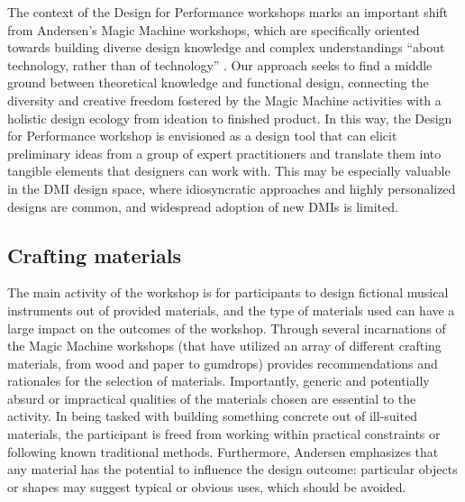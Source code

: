 \documentclass[letterpaper, 12pt]{article}
\begin{document}
The context of the Design for Performance workshops marks an important shift from Andersen's Magic Machine workshops, which are specifically oriented towards building diverse design knowledge and complex understandings ``about technology, rather than of technology'' \citep[p. 1]{Andersen2019}. Our approach seeks to find a middle ground between theoretical knowledge and functional design, connecting the diversity and creative freedom fostered by the Magic Machine activities with a holistic design ecology from ideation to finished product. In this way, the Design for Performance workshop is envisioned as a design tool that can elicit preliminary ideas from a group of expert practitioners and translate them into tangible elements that designers can work with. This may be especially valuable in the DMI design space, where idiosyncratic approaches and highly personalized designs are common, and widespread adoption of new DMIs is limited.


\subsection{Crafting materials}
\label{ch3-sec:crafting-materials}

The main activity of the workshop is for participants to design fictional musical instruments out of provided materials, and the type of materials used can have a large impact on the outcomes of the workshop. Through several incarnations of the Magic Machine workshops (that have utilized an array of different crafting materials, from wood and paper to gumdrops) \citet{Andersen2019} provides recommendations and rationales for the selection of materials. Importantly, generic and potentially absurd or impractical qualities of the materials chosen are essential to the activity. In being tasked with building something concrete out of ill-suited materials, the participant is freed from working within practical constraints or following known traditional methods. Furthermore, Andersen emphasizes that any material has the potential to influence the design outcome: particular objects or shapes may suggest typical or obvious uses, which should be avoided. 
\end{document}
